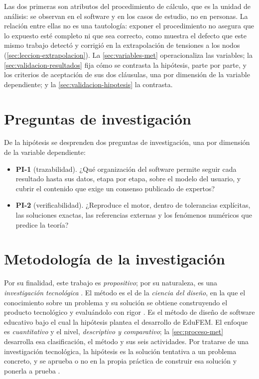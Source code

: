 Las dos primeras son atributos del procedimiento de cálculo, que es la unidad de análisis: se observan en el software y en los casos de estudio, no en personas. La relación entre ellas no es una tautología: exponer el procedimiento no asegura que lo expuesto esté completo ni que sea correcto, como muestra el defecto que este mismo trabajo detectó y corrigió en la extrapolación de tensiones a los nodos (\autoref{sec:leccion-extrapolacion}). La \autoref{sec:variables-met} operacionaliza las variables; la \autoref{sec:validacion-resultados} fija cómo se contrasta la hipótesis, parte por parte, y los criterios de aceptación de sus dos cláusulas, una por dimensión de la variable dependiente; y la \autoref{sec:validacion-hipotesis} la contrasta.

\section*{Preguntas de investigación}

De la hipótesis se desprenden dos preguntas de investigación, una por dimensión de la variable dependiente:
\begin{itemize}
    \item \textbf{PI-1} (trazabilidad). ¿Qué organización del software permite seguir cada resultado hasta sus datos, etapa por etapa, sobre el modelo del usuario, y cubrir el contenido que exige un consenso publicado de expertos?
    \item \textbf{PI-2} (verificabilidad). ¿Reproduce el motor, dentro de tolerancias explícitas, las soluciones exactas, las referencias externas y los fenómenos numéricos que predice la teoría?
\end{itemize}

\section*{Metodología de la investigación}

Por su finalidad, este trabajo es \emph{propositivo}; por su naturaleza, es una \emph{investigación tecnológica} \autocite[p.~91]{garciacordoba2005tecnologica}. El método es el de la \emph{ciencia del diseño}, en la que el conocimiento sobre un problema y su solución se obtiene construyendo el producto tecnológico y evaluándolo con rigor \autocite[pp.~75, 83]{hevner2004design}. Es el método de diseño de software educativo bajo el cual la hipótesis plantea el desarrollo de EduFEM. El enfoque es \emph{cuantitativo} y el nivel, \emph{descriptivo y comparativo}; la \autoref{sec:proceso-met} desarrolla esa clasificación, el método y sus seis actividades. Por tratarse de una investigación tecnológica, la hipótesis es la solución tentativa a un problema concreto, y se aprueba o no en la propia práctica de construir esa solución y ponerla a prueba \autocite[p.~85]{garciacordoba2005tecnologica}.

